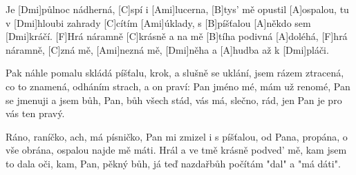 
\sloka
Je [Dmi]půlnoc nádherná, [C]spí i [Ami]lucerna,
[B]tys’ mě opustil [A]ospalou,
tu v [Dmi]hloubi zahrady [C]cítím [Ami]úklady,
s [B]píšťalou [A]někdo sem [Dmi]kráčí.
[F]Hrá náramně [C]krásně a na mě
[B]tíha podivná [A]doléhá,
[F]hrá náramně, [C]zná mě, [Ami]nezná mě,
[Dmi]něha a [A]hudba až k [Dmi]pláči.

\sloka
Pak náhle pomalu skládá píšťalu,
krok, a slušně se uklání,
jsem rázem ztracená, co to znamená,
odháním strach, a on praví:
Pan jméno mé, mám už renomé,
Pan se jmenuji a jsem bůh,
Pan, bůh všech stád, vás má, slečno, rád,
jen Pan je pro vás ten pravý.

\sloka
Ráno, raníčko, ach, má písničko,
Pan mi zmizel i s píšťalou,
od Pana, propána, o vše obrána,
ospalou najde mě máti.
Hrál a ve tmě krásně podved’ mě,
kam jsem to dala oči, kam,
Pan, pěkný bůh, já teď nazdařbůh
počítám "dal" a "má dáti". 
